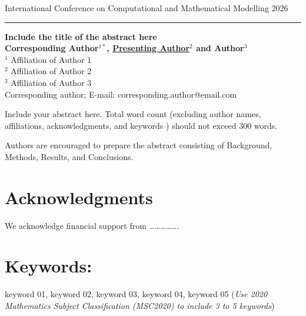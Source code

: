 \documentclass[twoside, 10pt, a4paper]{article}
\begin{document}
\vspace{44pt}
\begin{center}
\begin{flushleft}
\footnotesize International Conference on Computational and Mathematical Modelling 2026
\end{flushleft}
\vspace{10pt}
\hrule
\vspace{15pt}
{ \bf{\large Include the title of the abstract here}}\\
\vspace{10pt}
{\bf \small Corresponding Author$^{1*}$,  \bf \underline{Presenting Author}$^{2}$ and
Author$^{3}$}\\
$^{1}$ \small Affiliation of Author 1\\
$^{2}$ \small Affiliation of Author 2\\
$^{3}$ \small Affiliation of Author 3\\
\small *Corresponding author; E-mail: corresponding.author@email.com\\
\end{center}

\vspace{12pt}

\indent Include your abstract here. Total word count (excluding author names, affiliations, acknowledgments, and keywords ) should not exceed 300 words.

Authors are encouraged to prepare the abstract consisting of Background, Methods, Results, and Conclusions.

\section*{Acknowledgments}
We acknowledge financial support from …………….

\section*{Keywords:}
\small {keyword 01, keyword 02, keyword 03, keyword 04, keyword 05 (\textit{Use 2020 Mathematics Subject Classification (MSC2020) to include 3 to 5 keywords})}
\end{document}
